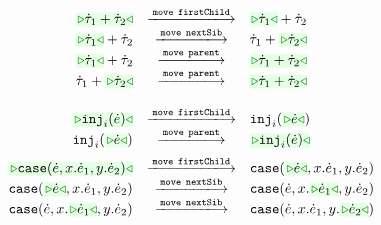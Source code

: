 \begin{figure}
\begin{displaymath}
\begin{array}{@{}rcl}
  \TABperformMove
      {\zwsel{\tsum{\htau_1}{\htau_2}}}
      {\aMove{\dChild}}
      {      {\tsum{\zwsel{\htau_1}}{\htau_2}}}
  \\
  \TABperformMove
      {      {\tsum{\zwsel{\htau_1}}{\htau_2}}}
      {\aMove{\dNext}}
      {      {\tsum{{\htau_1}}{\zwsel{\htau_2}}}}
  \\
  \TABperformMove
      {      {\tsum{\zwsel{\htau_1}}{\htau_2}}}
      {\aMove{\dParent}}
      {\zwsel{\tsum{{\htau_1}}{{\htau_2}}}}
  \\
  \TABperformMove
      {      {\tsum{{\htau_1}}{{\zwsel{\htau_2}}}}}
      {\aMove{\dParent}}
      {\zwsel{\tsum{{\htau_1}}{\htau_2}}}
  \\[2mm]
\end{array}
\end{displaymath}
\begin{displaymath}
\begin{array}{@{}rcl}
  \TABperformMove
      {\zwsel{\hinj{i}{\hexp}}}
      {\aMove{\dChild}}
      {\hinj{i}{\zwsel{\hexp}}}      
  \\
  \TABperformMove
      {\hinj{i}{\zwsel{\hexp}}}      
      {\aMove{\dParent}}
      {\zwsel{\hinj{i}{\hexp}}}
  \\[2mm]
  \TABperformMove
      {\zwsel{\hcase{\hexp}{x}{\hexp_1}{y}{\hexp_2}}}
      {\aMove{\dChild}}
      {      {\hcase{\zwsel{\hexp}}{x}{\hexp_1}{y}{\hexp_2}}}
  \\
  \TABperformMove
      {      {\hcase{\zwsel{\hexp}}{x}{\hexp_1}{y}{\hexp_2}}}
      {\aMove{\dNext}}
      {      {\hcase{{\hexp}}{x}{\zwsel{\hexp_1}}{y}{\hexp_2}}}
  \\
  \TABperformMove
      {      {\hcase{{\hexp}}{x}{\zwsel{\hexp_1}}{y}{\hexp_2}}}
      {\aMove{\dNext}}
      {      {\hcase{{\hexp}}{x}{{\hexp_1}}{y}{\zwsel{\hexp_2}}}}

\end{array}
\end{displaymath}
\end{figure}
